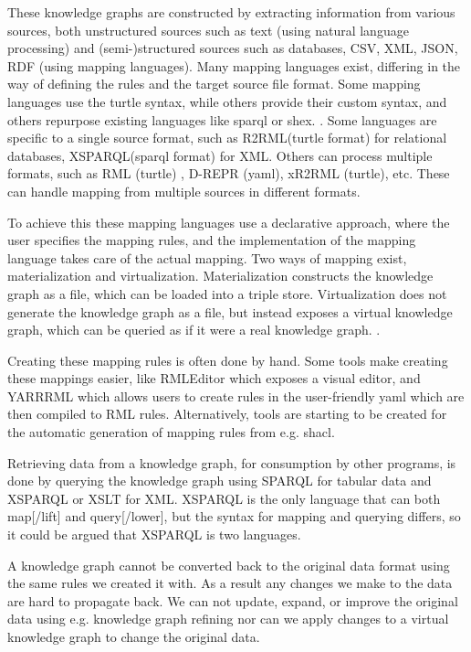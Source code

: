 These knowledge graphs are constructed by extracting information from various sources, both unstructured sources such as text (using natural language processing) and (semi-)structured sources such as databases, CSV, XML, JSON, RDF (using mapping languages). Many mapping languages exist, differing in the way of defining the rules and the target source file format. Some mapping languages use the turtle syntax, while others provide their custom syntax, and others repurpose existing languages like \acrshort{sparql} or \acrshort{shex}. \citep{VANASSCHE2023100753}. Some languages are specific to a single source format, such as R2RML(turtle format) \citep{Das:12:RRR} for relational databases, XSPARQL(\acrshort{sparql} format) \citep{Bischof2012} for XML. Others can process multiple formats, such as RML (turtle) \citep{dimou_ldow_2014}, D-REPR (\acrshort{yaml}), xR2RML (turtle), etc. These can handle mapping from multiple sources in different formats.

To achieve this these mapping languages use a declarative approach, where the user specifies the mapping rules, and the implementation of the mapping language takes care of the actual mapping. Two ways of mapping exist, materialization and virtualization. Materialization constructs the knowledge graph as a file, which can be loaded into a triple store. Virtualization does not generate the knowledge graph as a file, but instead exposes a virtual knowledge graph, which can be queried as if it were a real knowledge graph. \citep{ontop}.

Creating these mapping rules is often done by hand. Some tools make creating these mappings easier, like RMLEditor \citep{heyvaert_jws_2018} which exposes a visual editor, and YARRRML \citep{10.1007/978-3-319-98192-5_40} which allows users to create rules in the user-friendly \acrshort{yaml} which are then compiled to RML rules. Alternatively, tools are starting to be created for the automatic generation of mapping rules from e.g. \acrshort{shacl}.

Retrieving data from a knowledge graph, for consumption by other programs, is done by querying the knowledge graph using SPARQL \citep{Seaborne:08:SQL} for tabular data and XSPARQL \citep{Bischof2012} or XSLT for XML. XSPARQL is the only language that can both map[/lift] and query[/lower], but the syntax for mapping and querying differs, so it could be argued that XSPARQL is two languages.

A knowledge graph cannot be converted back to the original data format using the same rules we created it with. As a result any changes we make to the data are hard to propagate back. We can not update, expand, or improve the original data using e.g. knowledge graph refining nor can we apply changes to a virtual knowledge graph to change the original data. 

